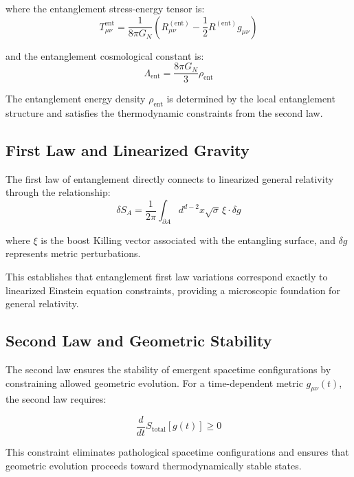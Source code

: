 \documentclass[twocolumn,showpacs,preprintnumbers,amsmath,amssymb,aps]{revtex4-1}
\begin{document}
where the entanglement stress-energy tensor is:
\begin{equation}
T_{\mu\nu}^{\text{ent}} = \frac{1}{8\pi G_N} \left( R_{\mu\nu}^{(\text{ent})} - \frac{1}{2} R^{(\text{ent})} g_{\mu\nu} \right)
\end{equation}

and the entanglement cosmological constant is:
\begin{equation}
\Lambda_{\text{ent}} = \frac{8\pi G_N}{3} \rho_{\text{ent}}
\end{equation}

The entanglement energy density $\rho_{\text{ent}}$ is determined by the local entanglement structure and satisfies the thermodynamic constraints from the second law.

\subsection{First Law and Linearized Gravity}

The first law of entanglement directly connects to linearized general relativity through the relationship:
\begin{equation}
\delta S_A = \frac{1}{2\pi} \int_{\partial A} d^{d-2}x \sqrt{\sigma} \, \xi \cdot \delta g
\label{eq:first_law_gravity}
\end{equation}

where $\xi$ is the boost Killing vector associated with the entangling surface, and $\delta g$ represents metric perturbations.

This establishes that entanglement first law variations correspond exactly to linearized Einstein equation constraints, providing a microscopic foundation for general relativity.

\subsection{Second Law and Geometric Stability}

The second law ensures the stability of emergent spacetime configurations by constraining allowed geometric evolution. For a time-dependent metric $g_{\mu\nu}(t)$, the second law requires:

\begin{equation}
\frac{d}{dt} S_{\text{total}}[g(t)] \geq 0
\label{eq:geometric_second_law}
\end{equation}

This constraint eliminates pathological spacetime configurations and ensures that geometric evolution proceeds toward thermodynamically stable states.
\end{document}

